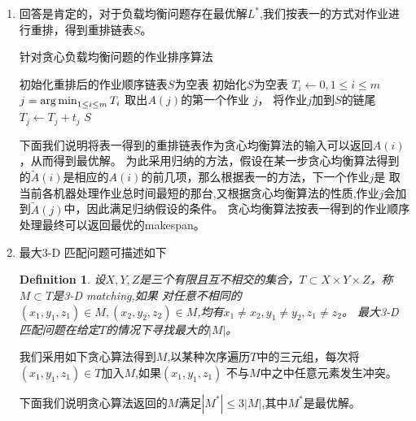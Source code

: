 \documentclass[a4paper]{article}
\newtheorem{Def}{Definition}
\begin{document}
\begin{enumerate}[label=\arabic*.]
  \setlength{\itemsep}{3\parskip}
  \setcounter{enumi}{7}
  \item 回答是肯定的，对于负载均衡问题存在最优解$L^*$,我们按表一的方式对作业进行重排，得到重排链表$S$。
    \begin{algorithm}
    \caption{针对贪心负载均衡问题的作业排序算法}\label{alg}
    \begin{algorithmic}[1]
    \STATE 初始化重排后的作业顺序链表$S$为空表
    \STATE 初始化$S$为空表
    \STATE $T_i\leftarrow 0,1\leq i\leq m$
    \STATE $j=\operatorname*{arg\,min}_{1\leq i\leq m} T_i$
    \STATE 取出$A(j)$的第一个作业 $j$，
    \STATE 将作业$j$加到$S$的链尾   
    \STATE $T_j\leftarrow T_j+t_j$
    \ENDWHILE
    \RETURN $S$        
    \end{algorithmic}
    \end{algorithm}
   下面我们说明将表一得到的重排链表作为贪心均衡算法的输入可以返回$A(i)$，从而得到最优解。   
   为此采用归纳的方法，假设在某一步贪心均衡算法得到的$\tilde{A}(i)$是相应的$A(i)$的前几项，那么根据表一的方法，下一个作业$j$是
   取当前各机器处理作业总时间最短的那台,又根据贪心均衡算法的性质,作业$j$会加到$\tilde{A}(j)$中，因此满足归纳假设的条件。
   贪心均衡算法按表一得到的作业顺序处理最终可以返回最优的makespan。
  \item 最大3-D 匹配问题可描述如下
  \begin{Def}
  设$X,Y,Z$是三个有限且互不相交的集合，$T\subset X\times Y\times Z$，称$M\subset T$是3-D matching,如果
  对任意不相同的$(x_1,y_1,z_1)\in M,(x_2,y_2,z_2)\in M$,均有$x_1\neq x_2,y_1\neq y_2,z_1\neq z_2$。
  最大3-D 匹配问题在给定$T$的情况下寻找最大的$|M|$。
  \end{Def}
  我们采用如下贪心算法得到$M$,以某种次序遍历$T$中的三元组，每次将$(x_1,y_1,z_1)\in T$加入$M$,如果$(x_1,y_1,z_1)$
  不与$M$中之中任意元素发生冲突。
  
  下面我们说明贪心算法返回的$M$满足$|M^*|\leq 3|M|$,其中$M^*$是最优解。
  

\end{enumerate}
\end{document}
